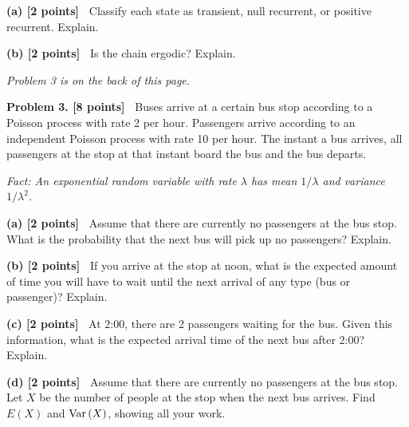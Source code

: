 \documentclass{article}
\newcommand{\svskip}{\vspace{.2in}}
\newcommand{\mvskip}{\vspace{.25in}}
\newcommand{\lvskip}{\vspace{.5in}}
\def\Var{\mathop{\rm Var\,}\nolimits}
\begin{document}
\svskip 
{\bf(a) [2 points]\ }  
Classify each state as transient, null recurrent, or positive recurrent.  Explain.

\svskip 
{\bf(b) [2 points]\ }  
Is the chain ergodic?  Explain.

\lvskip 
\begin{center}
{\em Problem 3 is on the back of this page.}
\end{center}

\newpage
{\bf Problem 3.  [8 points]\ } 
Buses arrive at a certain bus stop according to a Poisson process with rate
2 per hour.  
Passengers arrive according to an independent Poisson process with rate
10 per hour.  The instant a bus arrives, all passengers at the stop at that instant board the
bus and the bus departs.  

\svskip
{\em Fact:  An exponential random variable with rate $\lambda$ has
mean $1/\lambda$ and variance $1/\lambda^2$.}

\mvskip
{\bf(a) [2 points]\ }  
Assume that there are currently no passengers at the bus stop.
What is the probability that the next bus will pick up no passengers?  Explain.

\svskip
{\bf(b) [2 points]\ }  
If you arrive at the stop at noon, what is the expected amount of time you will have to wait until
the next arrival of any type (bus or passenger)?  Explain.

\svskip
{\bf(c) [2 points]\ }  
At 2:00, there are 2 passengers waiting for the bus.
Given this information, what is the expected arrival time of the next bus after 2:00?
Explain.

\svskip 
{\bf(d) [2 points]\ }  
Assume that there are currently no passengers at the bus stop.
Let $X$ be the number of people at the stop when the next bus arrives.
Find $E(X)$ and $\Var(X)$, showing all your work.
\end{document}
